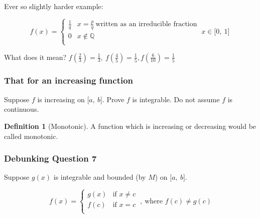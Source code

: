 \documentclass[12pt]{article}
\theoremstyle{plain}
\theoremstyle{remark}
\theoremstyle{definition}
\newtheorem{definition}{Definition}[section]
\begin{document}
Ever so slightly harder example:

\[f(x) = \left\{ \begin{matrix}
\frac{1}{q} & x = \frac{p}{q}\ \text{written\ as\ an\ irreducible\ fraction} \\
0 & x\mathbb{\notin Q} \\
\end{matrix} \right.\ {x \in \lbrack 0,\ 1\rbrack}\ \]

What does it mean?
\(f\left( \frac{2}{3} \right) = \frac{1}{3},\ f\left( \frac{4}{5} \right) = \frac{1}{5},f\left( \frac{6}{10} \right) = \frac{1}{5}\)



\subsubsection{That for an increasing
function}

Suppose \(f\) is increasing on \(\lbrack a,\ b\rbrack\). Prove \(f\) is
integrable. Do not assume \(f\) is continuous.

\begin{definition}[Monotonic]
A function which is increasing or
decreasing would be called monotonic.
\end{definition}


\subsubsection{Debunking Question 7}

Suppose \(g(x)\) is integrable and bounded (by \(M\)) on
\(\lbrack a,\ b\rbrack\).

\[f(x) = \left\{ \begin{matrix}
g(x) & \text{if\ }x \neq c \\
f(c) & \text{if\ }x = c \\
\end{matrix} \right.\ ,\ \text{where\ }f(c) \neq g(c)\]
\end{document}

